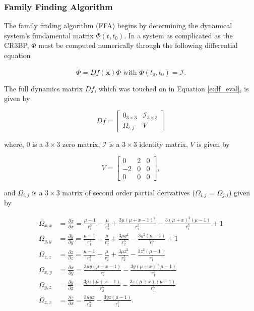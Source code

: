 \documentclass[11pt]{article} %
\begin{document}
\subsubsection{Family Finding Algorithm}
The family finding algorithm (FFA) begins by determining the dynamical system's fundamental matrix $\Phi\left(t,t_0\right)$. In a system as complicated as the CR3BP, $\Phi$ must be computed numerically through the following differential equation

\begin{equation}
	\dot{\Phi}=Df\left(\bm{x}\right)\Phi \text{ with } \Phi\left(t_0,t_0\right)=\mathcal{I}.
\end{equation}

\noindent
The full dynamics matrix $Df$, which was touched on in Equation \ref{e:df_eval}, is given by

\doublespace
\begin{equation}
	\label{e:df_full}
	Df = \begin{bmatrix}
		0_{3\times3} & \mathcal{I}_{3\times3} \\
		\Omega_{i,j} & V
	\end{bmatrix}
\end{equation}
\singlespace

\noindent
where, $0$ is a $3\times3$ zero matrix, $\mathcal{I}$ is a $3\times3$ identity matrix, $V$ is given by

\begin{equation}
	V = \begin{bmatrix}
		0 & 2 & 0 \\
		-2 & 0 & 0 \\
		0 & 0 & 0
	\end{bmatrix},
\end{equation}

\noindent
and $\Omega_{i,j}$ is a $3\times3$ matrix of second order partial derivatives ($\Omega_{i,j}$ = $\Omega_{j,i}$) given by

\begin{align}
	\Omega_{x,x} &= \frac{\partial\ddot{x}}{\partial x} = \frac{\mu - 1}{r_1^3} - \frac{\mu}{r_2^3} + \frac{3\mu\left(\mu+x-1\right)^2}{r_2^5} - \frac{3\left(\mu+x\right)^2\left(\mu-1\right)}{r_1^5} + 1 \\
	\Omega_{y,y} &= \frac{\partial\ddot{y}}{\partial y} = \frac{\mu - 1}{r_1^3} - \frac{\mu}{r_2^3} + \frac{3\mu y^2}{r_2^5} - \frac{3y^2\left(\mu-1\right)}{r_1^5} + 1 \\
	\Omega_{z,z} &= \frac{\partial\ddot{z}}{\partial z} = \frac{\mu - 1}{r_1^3} - \frac{\mu}{r_2^3} + \frac{3\mu z^2}{r_2^5} - \frac{3z^2\left(\mu-1\right)}{r_1^5} \\
	\Omega_{x,y} &= \frac{\partial\ddot{x}}{\partial y} = \frac{3\mu y\left(\mu+x-1\right)}{r_2^5} - \frac{3y\left(\mu+x\right)\left(\mu-1\right)}{r_1^5} \\
	\Omega_{y,z} &= \frac{\partial\ddot{y}}{\partial z} = \frac{3\mu z\left(\mu+x-1\right)}{r_2^5} - \frac{3z\left(\mu+x\right)\left(\mu-1\right)}{r_1^5}\\
	\Omega_{z,x} &= \frac{\partial\ddot{z}}{\partial x} = \frac{3\mu yz}{r_2^5} - \frac{3yz\left(\mu-1\right)}{r_1^5}.
\end{align}
\end{document}
